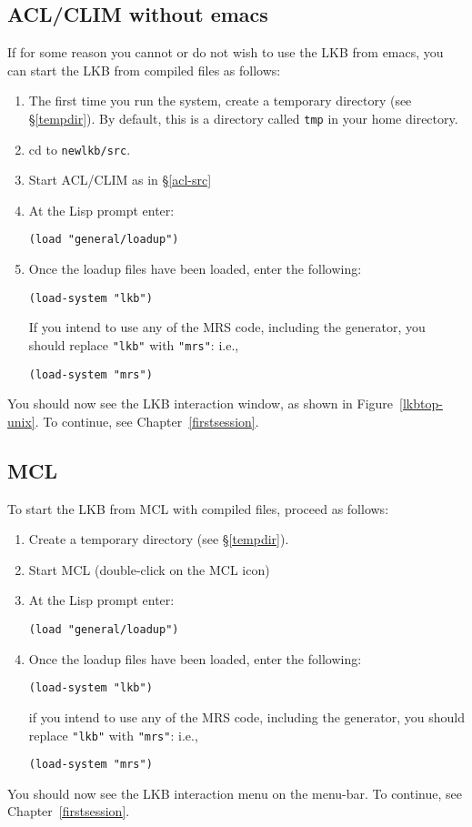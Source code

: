 \documentclass[12pt]{report}
\newcommand{\filename}[1]{{\tt #1}}
\begin{document}
\subsection{ACL/CLIM without emacs}
\label{acl-comp}

If for some reason you cannot or do not wish to use
the LKB from emacs, you can start the LKB from compiled files as follows:
\begin{enumerate}
\item The first time you run the system,
create a temporary directory (see \S\ref{tempdir}).  By default, this is
a directory called \filename{tmp} in your home directory.
\item cd to \filename{newlkb/src}.  
\item Start ACL/CLIM as in \S\ref{acl-src}
\item At the Lisp prompt enter:
\begin{verbatim}
(load "general/loadup") 
\end{verbatim}
\item Once the loadup files have been loaded, enter the following:
\begin{verbatim}
(load-system "lkb")
\end{verbatim}
If you intend to use any of the MRS code, including the generator,
you should replace \verb+"lkb"+ with \verb+"mrs"+: i.e.,
\begin{verbatim}
(load-system "mrs")
\end{verbatim}
\end{enumerate}
You
should now see the LKB interaction window, as shown in 
Figure~\ref{lkbtop-unix}.
To continue, see Chapter~\ref{firstsession}.

\subsection{MCL}
\label{mcl-comp}

To start the LKB from MCL with compiled files, proceed as follows:
\begin{enumerate}
\item Create a temporary directory (see \S\ref{tempdir}).
\item Start MCL (double-click on the MCL icon)
\item At the Lisp prompt enter:
\begin{verbatim}
(load "general/loadup") 
\end{verbatim}
\item Once the loadup files have been loaded, enter the following:
\begin{verbatim}
(load-system "lkb")
\end{verbatim}
if you intend to use any of the MRS code, including the generator,
you should replace \verb+"lkb"+ with \verb+"mrs"+: i.e.,
\begin{verbatim}
(load-system "mrs")
\end{verbatim}
\end{enumerate}
You
should now see the LKB interaction menu on the menu-bar.
To continue, see Chapter~\ref{firstsession}.
\end{document}
